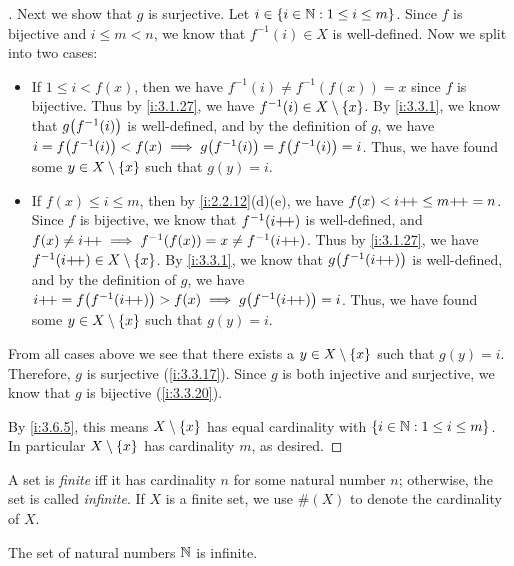 \begin{proof}[]
  Next we show that \(g\) is surjective.
  Let \(i \in \left\lbrace i \in \mathbb{N} : 1 \leq i \leq m\right\rbrace\).
  Since \(f\) is bijective and \(i \leq m < n\), we know that \(f^{-1}(i) \in X\) is well-defined.
  Now we split into two cases:
  \begin{itemize}
    \item If \(1 \leq i < f(x)\), then we have \(f^{-1}(i) \neq f^{-1}(f(x)) = x\) since \(f\) is bijective.
          Thus by \cref{i:3.1.27}, we have \(f^{-1}(i) \in X \setminus \left\lbrace x\right\rbrace\).
          By \cref{i:3.3.1}, we know that \(g\pa{f^{-1}(i)}\) is well-defined, and by the definition of \(g\), we have \(i = f\pa{f^{-1}(i)} < f(x) \implies g\pa{f^{-1}(i)} = f\pa{f^{-1}(i)} = i\).
          Thus, we have found some \(y \in X \setminus \left\lbrace x\right\rbrace\) such that \(g(y) = i\).
    \item If \(f(x) \leq i \leq m\), then by \cref{i:2.2.12}(d)(e), we have \(f(x) < i{+}\!{+} \leq m{+}\!{+} = n\).
          Since \(f\) is bijective, we know that \(f^{-1}(i{+}\!{+})\) is well-defined, and \(f(x) \neq i{+}\!{+} \implies f^{-1}(f(x)) = x \neq f^{-1}(i{+}\!{+})\).
          Thus by \cref{i:3.1.27}, we have \(f^{-1}(i{+}\!{+}) \in X \setminus \left\lbrace x\right\rbrace\).
          By \cref{i:3.3.1}, we know that \(g\pa{f^{-1}(i\pp)}\) is well-defined, and by the definition of \(g\), we have \(i\pp = f\pa{f^{-1}(i\pp)} > f(x) \implies g\pa{f^{-1}(i\pp)} = i\).
          Thus, we have found some \(y \in X \setminus \left\lbrace x\right\rbrace\) such that \(g(y) = i\).
  \end{itemize}
  From all cases above we see that there exists a \(y \in X \setminus \left\lbrace x\right\rbrace\) such that \(g(y) = i\).
  Therefore, \(g\) is surjective (\cref{i:3.3.17}).
  Since \(g\) is both injective and surjective, we know that \(g\) is bijective (\cref{i:3.3.20}).

  By \cref{i:3.6.5}, this means \(X \setminus \left\lbrace x\right\rbrace\) has equal cardinality with \(\left\lbrace i \in \mathbb{N} : 1 \leq i \leq m\right\rbrace\).
  In particular \(X \setminus \left\lbrace x\right\rbrace\) has cardinality \(m\), as desired.
\end{proof}

\begin{defn}\label{i:3.6.10}
  A set is \emph{finite} iff it has cardinality \(n\) for some natural number \(n\);
  otherwise, the set is called \emph{infinite}.
  If \(X\) is a finite set, we use \(\#(X)\) to denote the cardinality of \(X\).
\end{defn}

\setcounter{thm}{11}
\begin{thm}\label{i:3.6.12}
  The set of natural numbers \(\mathbb{N}\) is infinite.
\end{thm}

